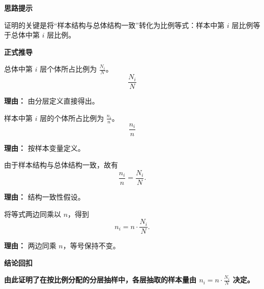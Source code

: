 \begin{proofbox}
	\textbf{\textcolor{CProof}{思路提示}}

	证明的关键是将“样本结构与总体结构一致”转化为比例等式：样本中第 $i$ 层比例等于总体中第 $i$ 层比例。

	\medskip
	\textbf{\textcolor{CProof}{正式推导}}
	\begin{description}[style=nextline, leftmargin=2.8em, labelsep=0.5em, itemsep=0.55em]
		\item[\textbf{步骤一（总体比例）：}] 总体中第 $i$ 层个体所占比例为 $\frac{N_i}{N}$。
			\[
				\frac{N_i}{N}
			\]
			\par\textbf{理由：} 由分层定义直接得出。
		\item[\textbf{步骤二（样本比例）：}] 样本中第 $i$ 层的个体所占比例为 $\frac{n_i}{n}$。
			\[
				\frac{n_i}{n}
			\]
			\par\textbf{理由：} 按样本变量定义。
		\item[\textbf{步骤三（结构一致等式）：}] 由于样本结构与总体结构一致，故有
			\[
				\frac{n_i}{n} = \frac{N_i}{N}.
			\]
			\par\textbf{理由：} 结构一致性假设。
		\item[\textbf{步骤四（求解 $n_i$）：}] 将等式两边同乘以 $n$，得到
			\[
				n_i = n \cdot \frac{N_i}{N}.
			\]
			\par\textbf{理由：} 两边同乘 $n$，等号保持不变。
	\end{description}

	\medskip
	\textbf{\textcolor{CProof}{结论回扣}}

	\textbf{由此证明了在按比例分配的分层抽样中，各层抽取的样本量由 $n_i = n \cdot \frac{N_i}{N}$ 决定。}
\end{proofbox}
